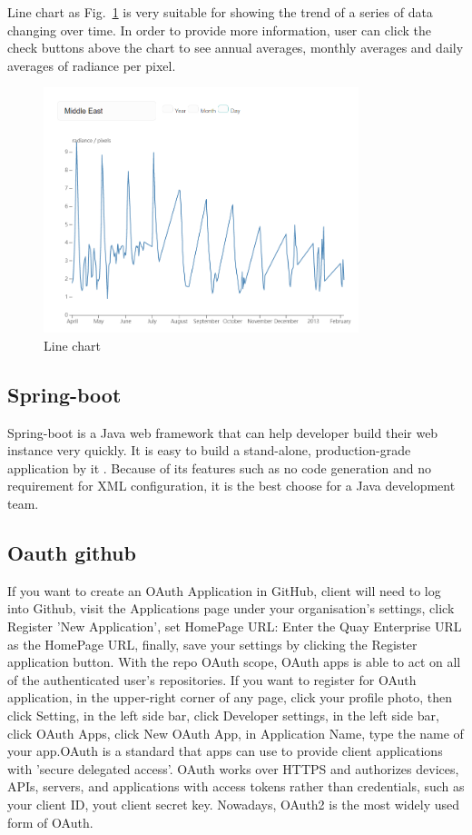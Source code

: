 \documentclass[conference]{IEEEtran}
\begin{document}
Line chart as Fig.~\ref{lchart} is very suitable for showing the trend of a series of data changing over time. In order to provide more 
information, user can click the check buttons above the chart to see annual averages, monthly averages and daily averages of radiance 
per pixel.  

\begin{figure}[htbp]
    \centerline{\includegraphics[width=260pt]{images/Line_chart.png}}
    \caption{Line chart}
    \label{lchart}
\end{figure}

\subsection{Spring-boot}

Spring-boot is a Java web framework that can help developer build their web instance very quickly. It is easy to build a 
stand-alone, production-grade application by it \cite{SpringBo66:online}. Because of its features such as no code generation 
and no requirement for XML configuration, it is the best choose for a Java development team.

\subsection{Oauth github}
If you want to create an OAuth Application in GitHub, client will need to log into Github, visit
the Applications page under your organisation's settings, click Register 'New Application',
set HomePage URL: Enter the Quay Enterprise URL as the HomePage URL, finally, save your settings by
clicking the Register application button. With the repo OAuth scope, OAuth apps is able to act on
all of the authenticated user's repositories. If you want to register for OAuth application,
in the upper-right corner of any page, click your profile photo, then click Setting, in the
left side bar, click Developer settings, in the left side bar, click OAuth Apps, click New
OAuth App, in Application Name, type the name of your app.OAuth is a standard that apps can
use to provide client applications with 'secure delegated access'. OAuth works over HTTPS and
authorizes devices, APIs, servers, and applications with access tokens rather than credentials,
such as your client ID, yout client secret key. Nowadays, OAuth2 is the most widely used form of
OAuth.
\end{document}

